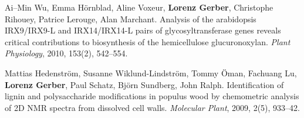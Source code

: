 \documentclass[10pt]{article}
\begin{document}
\begin{bibenum}
                                                                                           \item Ai--Min Wu, Emma H\"{o}rnblad, Aline Voxeur, \textbf{Lorenz Gerber},
                                                                                             Christophe Rihouey, Patrice Lerouge, Alan Marchant. Analysis
                                                                                             of the arabidopsis IRX9/IRX9-L and IRX14/IRX14-L pairs of
                                                                                             glycosyltransferase genes reveals critical contributions
                                                                                             to biosynthesis of the hemicellulose glucuronoxylan. \emph{Plant
                                                                                               Physiology}, 2010, 153(2), 542--554.\\

                                                                                           \item Mattias Hedenstr\"{o}m, Susanne Wiklund-Lindstr\"{o}m,
                                                                                             Tommy \"{O}man, Fachuang Lu, \textbf{Lorenz Gerber},
                                                                                             Paul Schatz, Bj\"{o}rn Sundberg, John Ralph.
                                                                                             Identification of lignin and polysaccharide modifications
                                                                                             in populus wood by chemometric analysis of 2D NMR spectra
                                                                                             from dissolved cell walls. \emph{Molecular Plant}, 2009, 2(5), 933--42.\\


                                                                                           \end{bibenum}


                                                                                           
\end{document}
